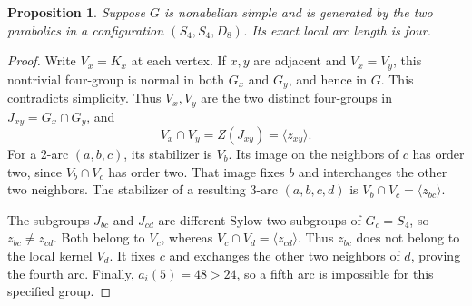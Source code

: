\documentclass[11pt]{article}
\newtheorem{proposition}[lemma]{Proposition}
\begin{document}
\begin{proposition}\label{s4pair}
Suppose $G$ is nonabelian simple and is generated by the two parabolics
in a configuration $(S_4,S_4,D_8)$. Its exact local arc length is four.
\end{proposition}
\begin{proof}
Write $V_x=K_x$ at each vertex. If $x,y$ are adjacent and $V_x=V_y$,
this nontrivial four-group is normal in both $G_x$ and $G_y$, and hence
in $G$. This contradicts simplicity. Thus $V_x,V_y$ are the two distinct
four-groups in $J_{xy}=G_x\cap G_y$, and
\[
 V_x\cap V_y=Z(J_{xy})=\langle z_{xy}\rangle.
\]
For a $2$-arc $(a,b,c)$, its stabilizer is $V_b$. Its image on the
neighbors of $c$ has order two, since $V_b\cap V_c$ has order two.
That image fixes $b$ and interchanges the other two neighbors. The
stabilizer of a resulting $3$-arc $(a,b,c,d)$ is
$V_b\cap V_c=\langle z_{bc}\rangle$.

The subgroups $J_{bc}$ and $J_{cd}$ are different Sylow two-subgroups
of $G_c=S_4$, so $z_{bc}\ne z_{cd}$. Both belong to $V_c$, whereas
$V_c\cap V_d=\langle z_{cd}\rangle$. Thus $z_{bc}$ does not belong
to the local kernel $V_d$. It fixes $c$ and exchanges the other two
neighbors of $d$, proving the fourth arc. Finally, $a_i(5)=48>24$,
so a fifth arc is impossible for this specified group.
\end{proof}
\end{document}
